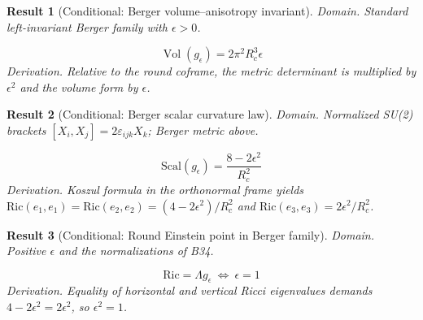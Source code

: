 \documentclass[aps,prd,onecolumn,notitlepage,groupedaddress,11pt]{revtex4-2}
\newtheorem{result}{Result}
\begin{document}
\begin{result}[\textsf{Conditional}: Berger volume--anisotropy invariant]\label{bridge:33}
\textit{Domain.} Standard left-invariant Berger family with \(\epsilon>0\).\par
\begin{equation}\label{bridgeeq:33}
\operatorname{Vol}(g_\epsilon)=2\pi^2R_c^3\epsilon
\end{equation}
\textit{Derivation.} Relative to the round coframe, the metric determinant is multiplied by \(\epsilon^2\) and the volume form by \(\epsilon\).
\end{result}
\begin{result}[\textsf{Conditional}: Berger scalar curvature law]\label{bridge:34}
\textit{Domain.} Normalized SU(2) brackets \([X_i,X_j]=2\varepsilon_{ijk}X_k\); Berger metric above.\par
\begin{equation}\label{bridgeeq:34}
\mathrm{Scal}(g_\epsilon)=\frac{8-2\epsilon^2}{R_c^2}
\end{equation}
\textit{Derivation.} Koszul formula in the orthonormal frame yields \(\mathrm{Ric}(e_1,e_1)=\mathrm{Ric}(e_2,e_2)=(4-2\epsilon^2)/R_c^2\) and \(\mathrm{Ric}(e_3,e_3)=2\epsilon^2/R_c^2\).
\end{result}
\begin{result}[\textsf{Conditional}: Round Einstein point in Berger family]\label{bridge:35}
\textit{Domain.} Positive \(\epsilon\) and the normalizations of B34.\par
\begin{equation}\label{bridgeeq:35}
\mathrm{Ric}=\Lambda g_\epsilon\ \Longleftrightarrow\ \epsilon=1
\end{equation}
\textit{Derivation.} Equality of horizontal and vertical Ricci eigenvalues demands \(4-2\epsilon^2=2\epsilon^2\), so \(\epsilon^2=1\).
\end{result}
\end{document}

